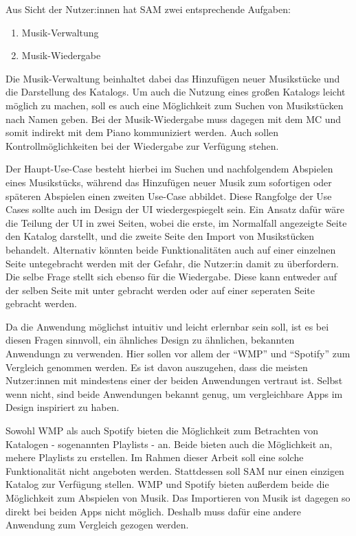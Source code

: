 Aus Sicht der Nutzer:innen hat \ac{SAM} zwei entsprechende Aufgaben:
\begin{enumerate}
    \item Musik-Verwaltung
    \item Musik-Wiedergabe
\end{enumerate}

Die Musik-Verwaltung beinhaltet dabei das Hinzufügen neuer Musikstücke und die Darstellung des Katalogs.
Um auch die Nutzung eines großen Katalogs leicht möglich zu machen, soll es auch eine Möglichkeit zum Suchen von Musikstücken nach Namen geben.
Bei der Musik-Wiedergabe muss dagegen mit dem \ac{MC} und somit indirekt mit dem Piano kommuniziert werden.
Auch sollen Kontrollmöglichkeiten bei der Wiedergabe zur Verfügung stehen.

Der Haupt-Use-Case besteht hierbei im Suchen und nachfolgendem Abspielen eines Musikstücks, während das Hinzufügen neuer Musik zum sofortigen oder späteren Abspielen einen zweiten Use-Case abbildet.
Diese Rangfolge der Use Cases sollte auch im Design der \ac{UI} wiedergespiegelt sein.
Ein Ansatz dafür wäre die Teilung der \ac{UI} in zwei Seiten, wobei die erste, im Normalfall angezeigte Seite den Katalog darstellt, und die zweite Seite den Import von Musikstücken behandelt.
Alternativ könnten beide Funktionalitäten auch auf einer einzelnen Seite untegebracht werden mit der Gefahr, die Nutzer:in damit zu überfordern.
Die selbe Frage stellt sich ebenso für die Wiedergabe.
Diese kann entweder auf der selben Seite mit unter gebracht werden oder auf einer seperaten Seite gebracht werden.

Da die Anwendung möglichst intuitiv und leicht erlernbar sein soll, ist es bei diesen Fragen sinnvoll, ein ähnliches Design zu ähnlichen, bekannten Anwendungn zu verwenden.
Hier sollen vor allem der \enquote{\ac{WMP}} und \enquote{Spotify} zum Vergleich genommen werden.
Es ist davon auszugehen, dass die meisten Nutzer:innen mit mindestens einer der beiden Anwendungen vertraut ist.
Selbst wenn nicht, sind beide Anwendungen bekannt genug, um vergleichbare Apps im Design inspiriert zu haben.

Sowohl \ac{WMP} als auch Spotify bieten die Möglichkeit zum Betrachten von Katalogen - sogenannten Playlists - an.
Beide bieten auch die Möglichkeit an, mehere Playlists zu erstellen.
Im Rahmen dieser Arbeit soll eine solche Funktionalität nicht angeboten werden.
Stattdessen soll \ac{SAM} nur einen einzigen Katalog zur Verfügung stellen.
\ac{WMP} und Spotify bieten außerdem beide die Möglichkeit zum Abspielen von Musik.
Das Importieren von Musik ist dagegen so direkt bei beiden Apps nicht möglich.
Deshalb muss dafür eine andere Anwendung zum Vergleich gezogen werden.

